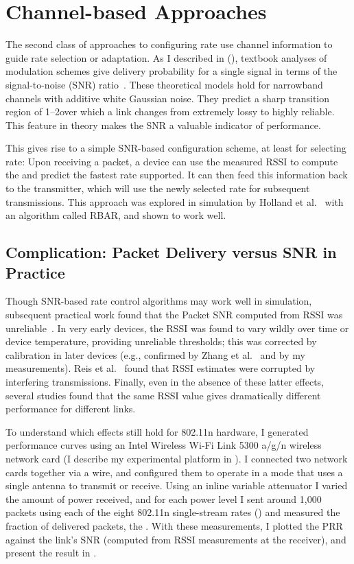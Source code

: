 \section{Channel-based Approaches}
The second class of approaches to configuring rate use channel information to guide rate selection or adaptation.
As I described in  (), textbook analyses of modulation schemes give delivery probability for a single signal in terms of the signal-to-noise (SNR) ratio~\cite{Goldsmith}.
These theoretical models hold for narrowband channels with additive white Gaussian noise. They predict a sharp transition region of 1--2\dB over which a link changes from extremely lossy to highly reliable. This feature in theory makes the SNR a valuable indicator of performance.

This gives rise to a simple SNR-based configuration scheme, at least for selecting rate: Upon receiving a packet, a device can use the measured RSSI to compute the  and predict the fastest rate supported. It can then feed this information back to the transmitter, which will use the newly selected rate for subsequent transmissions. This approach was explored in simulation by Holland et al.~\cite{Holland_RBAR} with an algorithm called RBAR, and shown to work well.

\subsection{Complication: Packet Delivery versus SNR in Practice}
Though SNR-based rate control algorithms may work well in simulation, subsequent practical work found that the Packet SNR computed from RSSI was unreliable~\cite{Aguayo_Roofnet, Reis_interference, Zhao_sensys03}. In very early devices, the RSSI was found to vary wildly over time or device temperature, providing unreliable thresholds; this was corrected by calibration in later devices (e.g., confirmed by Zhang et al.~\cite{Zhang_SNRguided} and by my measurements). Reis et al.~\cite{Reis_interference} found that RSSI estimates were corrupted by interfering transmissions. Finally, even in the absence of these latter effects, several studies found that the same RSSI value gives dramatically different performance for different links.

To understand which effects still hold for 802.11n hardware, I generated performance curves using an Intel Wireless Wi-Fi Link 5300 a/g/n wireless network card (I describe my experimental platform in ). I connected two network cards together via a wire, and configured them to operate in a mode that uses a single antenna to transmit or receive. Using an inline variable attenuator I varied the amount of power received, and for each power level I sent around 1,000 packets using each of the eight 802.11n single-stream rates () and measured the fraction of delivered packets, the . With these measurements, I plotted the PRR against the link's SNR (computed from RSSI measurements at the receiver), and present the result in . 

